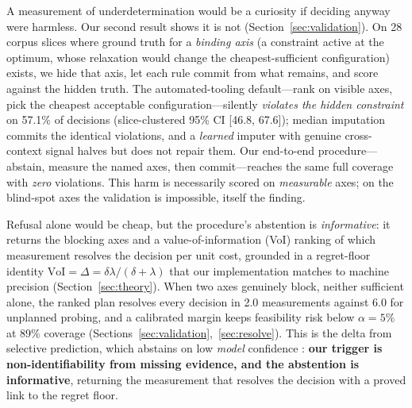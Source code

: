 \documentclass{article} %
\newcommand{\VoI}{\mathrm{VoI}}
\begin{document}
A measurement of underdetermination would be a curiosity if deciding anyway were harmless. Our second result shows it is not (Section~\ref{sec:validation}). On 28 corpus slices where ground truth for a \emph{binding axis} (a constraint active at the optimum, whose relaxation would change the cheapest-sufficient configuration) exists, we hide that axis, let each rule commit from what remains, and score against the hidden truth. The automated-tooling default---rank on visible axes, pick the cheapest acceptable configuration---silently \emph{violates the hidden constraint} on 57.1\% of decisions (slice-clustered 95\% CI [46.8, 67.6]); median imputation commits the identical violations, and a \emph{learned} imputer with genuine cross-context signal halves but does not repair them. Our end-to-end procedure---abstain, measure the named axes, then commit---reaches the same full coverage with \emph{zero} violations. This harm is necessarily scored on \emph{measurable} axes; on the blind-spot axes the validation is impossible, itself the finding.

Refusal alone would be cheap, but the procedure's abstention is \emph{informative}: it returns the blocking axes and a value-of-information (VoI) ranking of which measurement resolves the decision per unit cost, grounded in a regret-floor identity $\VoI=\Delta=\delta\lambda/(\delta+\lambda)$ that our implementation matches to machine precision (Section~\ref{sec:theory}). When two axes genuinely block, neither sufficient alone, the ranked plan resolves every decision in 2.0 measurements against 6.0 for unplanned probing, and a calibrated margin keeps feasibility risk below $\alpha=5\%$ at 89\% coverage (Sections~\ref{sec:validation},~\ref{sec:resolve}). This is the delta from selective prediction, which abstains on low \emph{model} confidence \citep{chow1970optimum,elyaniv2010foundations}: \textbf{our trigger is non-identifiability from missing evidence, and the abstention is informative}, returning the measurement that resolves the decision with a proved link to the regret floor.
\end{document}
